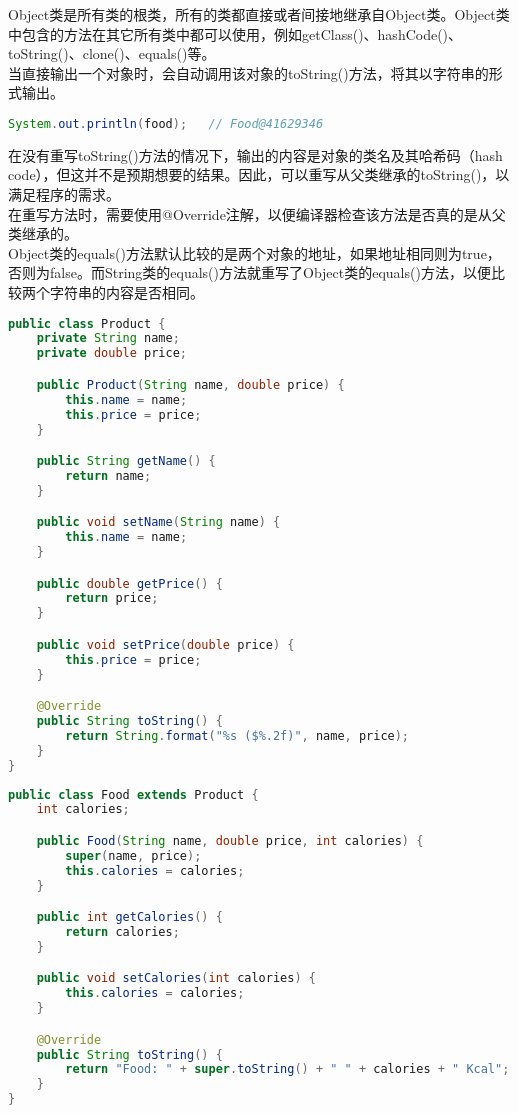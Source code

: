 Object类是所有类的根类，所有的类都直接或者间接地继承自Object类。Object类中包含的方法在其它所有类中都可以使用，例如getClass()、hashCode()、toString()、clone()、equals()等。\\

当直接输出一个对象时，会自动调用该对象的toString()方法，将其以字符串的形式输出。

\vspace{-0.5cm}

\begin{lstlisting}[language=Java]
System.out.println(food);   // Food@41629346
\end{lstlisting}

在没有重写toString()方法的情况下，输出的内容是对象的类名及其哈希码（hash code），但这并不是预期想要的结果。因此，可以重写从父类继承的toString()，以满足程序的需求。\\

在重写方法时，需要使用@Override注解，以便编译器检查该方法是否真的是从父类继承的。\\

Object类的equals()方法默认比较的是两个对象的地址，如果地址相同则为true，否则为false。而String类的equals()方法就重写了Object类的equals()方法，以便比较两个字符串的内容是否相同。\\


\begin{lstlisting}[language=Java]
public class Product {
    private String name;
    private double price;

    public Product(String name, double price) {
        this.name = name;
        this.price = price;
    }

    public String getName() {
        return name;
    }

    public void setName(String name) {
        this.name = name;
    }

    public double getPrice() {
        return price;
    }

    public void setPrice(double price) {
        this.price = price;
    }

    @Override
    public String toString() {
        return String.format("%s ($%.2f)", name, price);
    }
}
\end{lstlisting}

\begin{lstlisting}[language=Java]
public class Food extends Product {
    int calories;

    public Food(String name, double price, int calories) {
        super(name, price);
        this.calories = calories;
    }

    public int getCalories() {
        return calories;
    }

    public void setCalories(int calories) {
        this.calories = calories;
    }

    @Override
    public String toString() {
        return "Food: " + super.toString() + " " + calories + " Kcal";
    }
}
\end{lstlisting}

